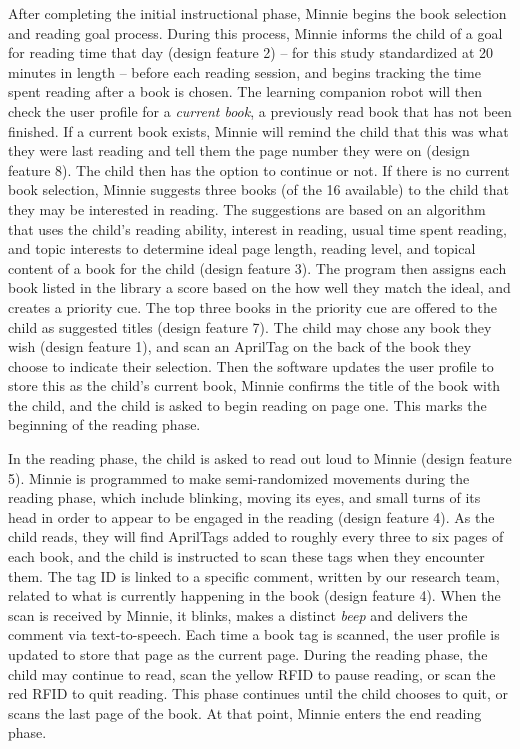 \documentclass{sigchi}
\begin{document}
After completing the initial instructional phase, Minnie begins the book selection and reading goal process. During this process, Minnie informs the child of a goal for reading time that day (design feature 2) -- for this study standardized at 20 minutes in length -- before each reading session, and begins tracking the time spent reading after a book is chosen. The learning companion robot will then check the user profile for a \textit{current book}, a previously read book that has not been finished. If a current book exists, Minnie will remind the child that this was what they were last reading and tell them the page number they were on (design feature 8). The child then has the option to continue or not. If there is no current book selection, Minnie suggests three books (of the 16 available) to the child that they may be interested in reading. The suggestions are based on an algorithm that uses the child's reading ability, interest in reading, usual time spent reading, and topic interests to determine ideal page length, reading level, and topical content of a book for the child (design feature 3). The program then assigns each book listed in the library a score based on the how well they match the ideal, and creates a priority cue. The top three books in the priority cue are offered to the child as suggested titles (design feature 7). The child may chose any book they wish (design feature 1), and scan an AprilTag on the back of the book they choose to indicate their selection. Then the software updates the user profile to store this as the child's current book, Minnie confirms the title of the book with the child, and the child is asked to begin reading on page one. This marks the beginning of the reading phase.

In the reading phase, the child is asked to read out loud to Minnie (design feature 5). Minnie is programmed to make semi-randomized movements during the reading phase, which include blinking, moving its eyes, and small turns of its head in order to appear to be engaged in the reading (design feature 4). As the child reads, they will find AprilTags added to roughly every three to six pages of each book, and the child is instructed to scan these tags when they encounter them. The tag ID is linked to a specific comment, written by our research team, related to what is currently happening in the book (design feature 4). When the scan is received by Minnie, it blinks, makes a distinct \textit{beep} and delivers the comment via text-to-speech. Each time a book tag is scanned, the user profile is updated to store that page as the current page. During the reading phase, the child may continue to read, scan the yellow RFID to pause reading, or scan the red RFID to quit reading. This phase continues until the child chooses to quit, or scans the last page of the book. At that point, Minnie enters the end reading phase.
\end{document}
